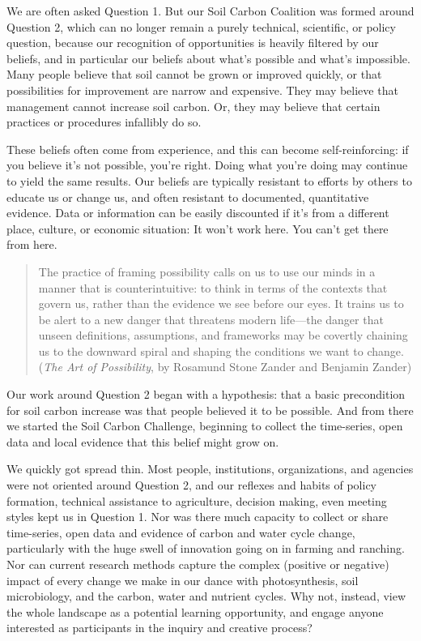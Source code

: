 \documentclass[11pt,letterpaper,twoside,onecolumn]{memoir}
\begin{document}
We are often asked Question 1. But our Soil Carbon Coalition was formed around Question 2, which can no longer remain a purely technical, scientific, or policy question, because our recognition of opportunities is heavily filtered by our beliefs, and in particular our beliefs about what's possible and what's impossible. Many people believe that soil cannot be grown or improved quickly, or that possibilities for improvement are narrow and expensive. They may believe that management cannot increase soil carbon. Or, they may believe that certain practices or procedures infallibly do so.

These beliefs often come from experience, and this can become self-reinforcing: if you believe it's not possible, you're right. Doing what you're doing may continue to yield the same results. Our beliefs are typically resistant to efforts by others to educate us or change us, and often resistant to documented, quantitative evidence. Data or information can be easily discounted if it's from a different place, culture, or economic situation: It won't work here. You can't get there from here.

\begin{quotation}\small
\noindent The practice of framing possibility calls on us to use our minds in a manner that is counterintuitive: to think in terms of the contexts that govern us, rather than the evidence we see before our eyes. It trains us to be alert to a new danger that threatens modern life---the danger that unseen definitions, assumptions, and frameworks may be covertly chaining us to the downward spiral and shaping the conditions we want to change. (\textit{The Art of Possibility}, by Rosamund Stone Zander and Benjamin Zander)
\end{quotation}

Our work around Question 2 began with a hypothesis: that a basic precondition for soil carbon increase was that people believed it to be possible. And from there we started the Soil Carbon Challenge, beginning to collect the time-series, open data and local evidence that this belief might grow on.

We quickly got spread thin. Most people, institutions, organizations, and agencies were not oriented around Question 2, and our reflexes and habits of policy formation, technical assistance to agriculture, decision making, even meeting styles kept us in Question 1. Nor was there much capacity to collect or share time-series, open data and evidence of carbon and water cycle change, particularly with the huge swell of innovation going on in farming and ranching. Nor can current research methods capture the complex (positive or negative) impact of every change we make in our dance with photosynthesis, soil microbiology, and the carbon, water and nutrient cycles. Why not, instead, view the whole landscape as a potential learning opportunity, and engage anyone interested as participants in the inquiry and creative process?
\end{document}
